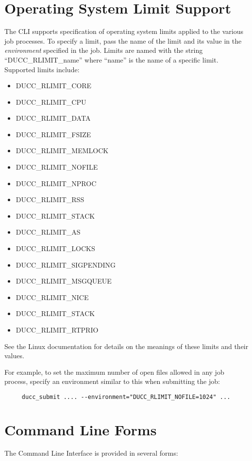     \section{Operating System Limit Support}
    The CLI supports specification of operating system limits applied to the various job processes.
    To specify a limit, pass the name of the limit and its value in the {\em environment} specified
    in the job.  Limits are named with the string ``DUCC\_RLIMIT\_name'' where ``name'' is the name of
    a specific limit.  Supported limits include:
    \begin{itemize}
       \item DUCC\_RLIMIT\_CORE    
       \item DUCC\_RLIMIT\_CPU    
       \item DUCC\_RLIMIT\_DATA   
       \item DUCC\_RLIMIT\_FSIZE  
       \item DUCC\_RLIMIT\_MEMLOCK
       \item DUCC\_RLIMIT\_NOFILE 
       \item DUCC\_RLIMIT\_NPROC  
       \item DUCC\_RLIMIT\_RSS    
       \item DUCC\_RLIMIT\_STACK  
       \item DUCC\_RLIMIT\_AS        
       \item DUCC\_RLIMIT\_LOCKS     
       \item DUCC\_RLIMIT\_SIGPENDING
       \item DUCC\_RLIMIT\_MSGQUEUE  
       \item DUCC\_RLIMIT\_NICE      
       \item DUCC\_RLIMIT\_STACK     
       \item DUCC\_RLIMIT\_RTPRIO   
    \end{itemize}
    See the Linux documentation for details on the meanings of these limits and their values.

    For example, to set the maximum number of open files allowed in any job process, specify 
    an environment similar to this when submitting the job:
\begin{verbatim}
     ducc_submit .... --environment="DUCC_RLIMIT_NOFILE=1024" ...
\end{verbatim}
    
    \section{Command  Line Forms}
    The Command Line Interface is provided in several forms:

